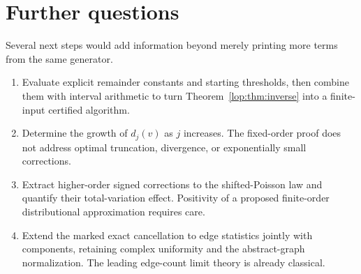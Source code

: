 \documentclass[11pt,letterpaper]{article}
\numberwithin{equation}{section}
\theoremstyle{remark}\newtheorem{remark}[theorem]{Remark}
\begin{document}
\section{Further questions}\label{lop:sec:questions}

Several next steps would add information beyond merely printing more
terms from the same generator.
\begin{enumerate}
\item Evaluate explicit remainder constants and starting thresholds,
then combine them with interval arithmetic to turn
Theorem~\ref{lop:thm:inverse} into a finite-input certified algorithm.
\item Determine the growth of $d_j(v)$ as $j$ increases. The fixed-order
proof does not address optimal truncation, divergence, or exponentially
small corrections.
\item Extract higher-order signed corrections to the shifted-Poisson
law and quantify their total-variation effect. Positivity of a proposed
finite-order distributional approximation requires care.
\item Extend the marked exact cancellation to edge statistics jointly
with components, retaining complex uniformity and the abstract-graph
normalization. The leading edge-count limit theory is already classical.
\end{enumerate}
\end{document}
